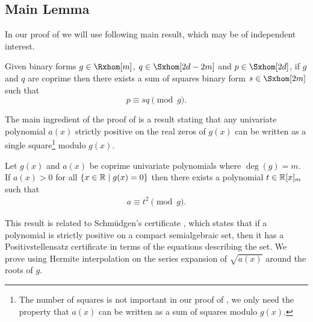\documentclass[final,onefignum,onetabnum]{siamart220329}
\begin{document}
\subsection{Main Lemma}
\label{sec:hgroup-proof}
In our proof of  we will use following main result, which may be
of independent interest.
\begin{lemma}
  \label{lem:hgroup}
  Given binary forms $g \in \Rxhom[m]$, $q \in \Sxhom[2d-2m]$ and
  $p \in \Sxhom[2d]$, if $g$ and $q$ are coprime then there exists a sum of
  squares binary form $s \in \Sxhom[2m]$ such that
  \begin{equation*}
    p \equiv s q \pmod{g}.
  \end{equation*}
\end{lemma}
The main ingredient of the proof of  is a result stating that
any univariate polynomial $a(x)$ strictly positive on the real zeros of $g(x)$
can be written as a single square\footnote{The number of squares is not
  important in our proof of , we only need the property that
  $a(x)$ can be written as a sum of squares modulo $g(x)$.}
modulo $g(x)$.
\begin{proposition}
  \label{prop:soscoprime}
  Let $g(x)$ and $a(x)$ be coprime univariate polynomials where $\deg(g) =
  m$. If $a(x) > 0$ for all $\{x \in \mathbb{R} \mid g(x) = 0 \}$ then there exists a
  polynomial $t \in \mathbb{R}[x]_{m}$ such that
  \begin{align*}
    a \equiv t^2 \pmod{g}.
  \end{align*}
\end{proposition}
This result is related to Schm{\"u}dgen's certificate \cite{schmudgen1991thek},
which states that if a polynomial is strictly positive on a compact
semialgebraic set, then it has a Positivstellensatz certificate in terms of the
equations describing the set. We prove  using Hermite
interpolation on the series expansion of $\sqrt{a(x)}$ around the roots of $g$.
\end{document}
